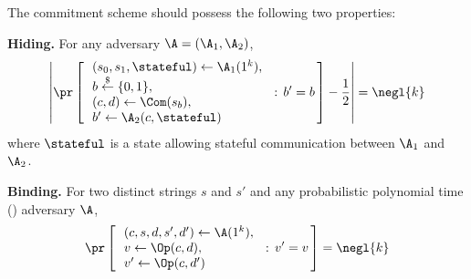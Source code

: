 The commitment scheme should possess the following two properties:
\begin{description}
\item \textbf{Hiding.} For any adversary $\A=(\A_1,\A_2)$,
  \begin{equation*}
      \left|\pr\left[\, \begin{array}{l}
        (s_0,s_1,\stateful) \gets \A_1(1^k),\\
        b \overset{\$}{\leftarrow} \{0,1\},\\
        (c,d) \gets \Com(s_b),\\
        b' \gets \A_2(c,\stateful)
      \end{array}\,: \, b'=b \,\right] - \frac{1}{2}\right| = \negl{k}
  \end{equation*}
  where $\stateful$ is a state allowing stateful communication between $\A_1$ and $\A_2$.

\item \textbf{Binding.} For two distinct strings $s$ and $s'$ and any probabilistic polynomial time (\ppt) adversary $\A$,
  \begin{equation*}
      \pr\left[\, \begin{array}{l}
        (c,s,d,s',d') \gets \A(1^k),\\
        v \gets \Op(c,d),\\
        v' \gets \Op(c,d')
      \end{array}\,: \, v'= v \,\right] = \negl{k}
  \end{equation*}
\end{description}

